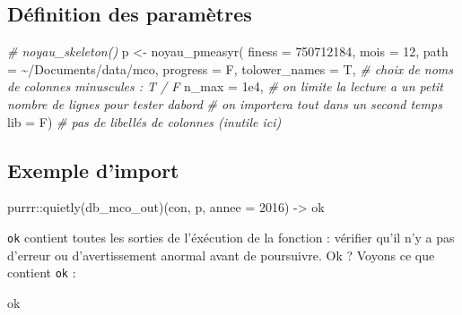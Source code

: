 \documentclass[
]{book}
\newenvironment{Shaded}{\begin{snugshade}}{\end{snugshade}}
\newcommand{\AttributeTok}[1]{\textcolor[rgb]{0.77,0.63,0.00}{#1}}
\newcommand{\CommentTok}[1]{\textcolor[rgb]{0.56,0.35,0.01}{\textit{#1}}}
\newcommand{\DecValTok}[1]{\textcolor[rgb]{0.00,0.00,0.81}{#1}}
\newcommand{\FloatTok}[1]{\textcolor[rgb]{0.00,0.00,0.81}{#1}}
\newcommand{\FunctionTok}[1]{\textcolor[rgb]{0.00,0.00,0.00}{#1}}
\newcommand{\NormalTok}[1]{#1}
\newcommand{\OtherTok}[1]{\textcolor[rgb]{0.56,0.35,0.01}{#1}}
\newcommand{\SpecialCharTok}[1]{\textcolor[rgb]{0.00,0.00,0.00}{#1}}
\newcommand{\StringTok}[1]{\textcolor[rgb]{0.31,0.60,0.02}{#1}}
\begin{document}
\hypertarget{duxe9finition-des-paramuxe8tres}{%
\subsection{Définition des paramètres}\label{duxe9finition-des-paramuxe8tres}}

\begin{Shaded}
\begin{Highlighting}[]
\CommentTok{\# noyau\_skeleton()}
\NormalTok{p }\OtherTok{\textless{}{-}} \FunctionTok{noyau\_pmeasyr}\NormalTok{(}
  \AttributeTok{finess   =} \StringTok{\textquotesingle{}750712184\textquotesingle{}}\NormalTok{,}
  \AttributeTok{mois     =} \DecValTok{12}\NormalTok{,}
  \AttributeTok{path     =} \StringTok{\textquotesingle{}\textasciitilde{}/Documents/data/mco\textquotesingle{}}\NormalTok{,}
  \AttributeTok{progress =}\NormalTok{ F, }
  \AttributeTok{tolower\_names =}\NormalTok{ T, }\CommentTok{\# choix de noms de colonnes minuscules : T / F}
  \AttributeTok{n\_max =} \FloatTok{1e4}\NormalTok{, }\CommentTok{\# on limite la lecture a un petit nombre de lignes pour tester d\textquotesingle{}abord }
  \CommentTok{\# on importera tout dans un second temps}
  \AttributeTok{lib =}\NormalTok{ F) }\CommentTok{\# pas de libellés de colonnes (inutile ici)}
\end{Highlighting}
\end{Shaded}

\hypertarget{exemple-dimport}{%
\subsection{Exemple d'import}\label{exemple-dimport}}

\begin{Shaded}
\begin{Highlighting}[]
\NormalTok{purrr}\SpecialCharTok{::}\FunctionTok{quietly}\NormalTok{(db\_mco\_out)(con,  p, }\AttributeTok{annee =} \DecValTok{2016}\NormalTok{) }\OtherTok{{-}\textgreater{}}\NormalTok{ ok }
\end{Highlighting}
\end{Shaded}

\texttt{ok} contient toutes les sorties de l'éxécution de la fonction : vérifier qu'il n'y a pas d'erreur ou d'avertissement anormal avant de poursuivre. Ok ? Voyons ce que contient \texttt{ok} :

\begin{Shaded}
\begin{Highlighting}[]
\NormalTok{ok}
\end{Highlighting}
\end{Shaded}
\end{document}

